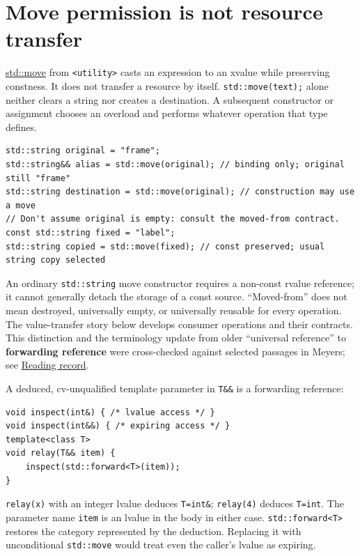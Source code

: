\section{Move permission is not resource transfer}\label{01-foundations-i-ch003-move-permission-is-not-resource-transfer}

\hyperref[appendix-0104b704fb11]{std::move} from \texttt{\textless{}utility\textgreater{}} casts an expression to an xvalue while preserving constness. It does not transfer a resource by itself. \texttt{std::move(text);} alone neither clears a string nor creates a destination. A subsequent constructor or assignment chooses an overload and performs whatever operation that type defines.

\begin{verbatim}
std::string original = "frame";
std::string&& alias = std::move(original); // binding only; original still "frame"
std::string destination = std::move(original); // construction may use a move
// Don't assume original is empty: consult the moved-from contract.
const std::string fixed = "label";
std::string copied = std::move(fixed); // const preserved; usual string copy selected
\end{verbatim}

An ordinary \texttt{std::string} move constructor requires a non-const rvalue reference; it cannot generally detach the storage of a const source. ``Moved-from'' does not mean destroyed, universally empty, or universally reusable for every operation. The value-transfer story below develops consumer operations and their contracts. This distinction and the terminology update from older ``universal reference'' to \textbf{forwarding reference} were cross-checked against selected passages in Meyers; see \hyperref[appendix-a103e7846d21-m008---borrowing-categories-and-const-access]{Reading record}.

A deduced, cv-unqualified template parameter in \texttt{T\&\&} is a forwarding reference:

\begin{verbatim}
void inspect(int&) { /* lvalue access */ }
void inspect(int&&) { /* expiring access */ }
template<class T>
void relay(T&& item) {
    inspect(std::forward<T>(item));
}
\end{verbatim}

\texttt{relay(x)} with an integer lvalue deduces \texttt{T=int\&}; \texttt{relay(4)} deduces \texttt{T=int}. The parameter name \texttt{item} is an lvalue in the body in either case. \texttt{std::forward\textless{}T\textgreater{}} restores the category represented by the deduction. Replacing it with unconditional \texttt{std::move} would treat even the caller's lvalue as expiring.


